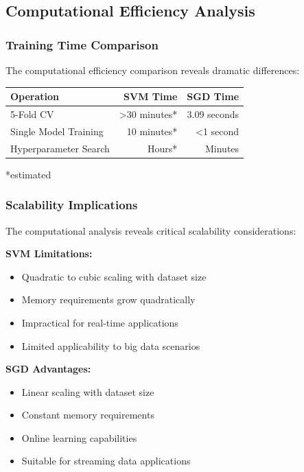 \documentclass[12pt,a4paper]{article}
\begin{document}
\subsection{Computational Efficiency Analysis}

\subsubsection{Training Time Comparison}

The computational efficiency comparison reveals dramatic differences:

\begin{center}
\begin{tabular}{|l|r|r|}
\hline
\textbf{Operation} & \textbf{SVM Time} & \textbf{SGD Time} \\
\hline
5-Fold CV & >30 minutes* & 3.09 seconds \\
\hline
Single Model Training & ~10 minutes* & <1 second \\
\hline
Hyperparameter Search & Hours* & Minutes \\
\hline
\end{tabular}
\end{center}
*estimated

\subsubsection{Scalability Implications}

The computational analysis reveals critical scalability considerations:

\textbf{SVM Limitations:}
\begin{itemize}
    \item Quadratic to cubic scaling with dataset size
    \item Memory requirements grow quadratically
    \item Impractical for real-time applications
    \item Limited applicability to big data scenarios
\end{itemize}

\textbf{SGD Advantages:}
\begin{itemize}
    \item Linear scaling with dataset size
    \item Constant memory requirements
    \item Online learning capabilities
    \item Suitable for streaming data applications
\end{itemize}
\end{document}
